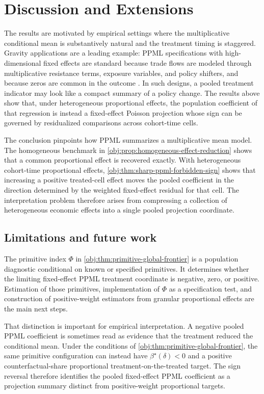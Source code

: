 \section{Discussion and Extensions}

The results are motivated by empirical settings where the multiplicative conditional mean is substantively natural and the treatment timing is staggered. Gravity applications are a leading example: PPML specifications with high-dimensional fixed effects are standard because trade flows are modeled through multiplicative resistance terms, exposure variables, and policy shifters, and because zeros are common in the outcome \citep{AndersonVanWincoop2003,HeadMayer2014,YotovPiermartiniMonteiroLarch2016,SantosSilvaTenreyro2006,SantosSilvaTenreyro2011,CorreiaGuimaraesZylkin2020}. In such designs, a pooled treatment indicator may look like a compact summary of a policy change. The results above show that, under heterogeneous proportional effects, the population coefficient of that regression is instead a fixed-effect Poisson projection whose sign can be governed by residualized comparisons across cohort-time cells.

The conclusion pinpoints how PPML summarizes a multiplicative mean model. The homogeneous benchmark in \cref{obj:prop:homogeneous-effect-reduction} shows that a common proportional effect is recovered exactly. With heterogeneous cohort-time proportional effects, \cref{obj:thm:sharp-ppml-forbidden-sign} shows that increasing a positive treated-cell effect moves the pooled coefficient in the direction determined by the weighted fixed-effect residual for that cell. The interpretation problem therefore arises from compressing a collection of heterogeneous economic effects into a single pooled projection coordinate.

\subsection{Limitations and future work}

The primitive index \(\Phi\) in \cref{obj:thm:primitive-global-frontier} is a population diagnostic conditional on known or specified primitives. It determines whether the limiting fixed-effect PPML treatment coordinate is negative, zero, or positive. Estimation of those primitives, implementation of \(\Phi\) as a specification test, and construction of positive-weight estimators from granular proportional effects are the main next steps.

That distinction is important for empirical interpretation. A negative pooled PPML coefficient is sometimes read as evidence that the treatment reduced the conditional mean. Under the conditions of \cref{obj:thm:primitive-global-frontier}, the same primitive configuration can instead have \(\beta^\star(\delta)<0\) and a positive counterfactual-share proportional treatment-on-the-treated target. The sign reversal therefore identifies the pooled fixed-effect PPML coefficient as a projection summary distinct from positive-weight proportional targets.


